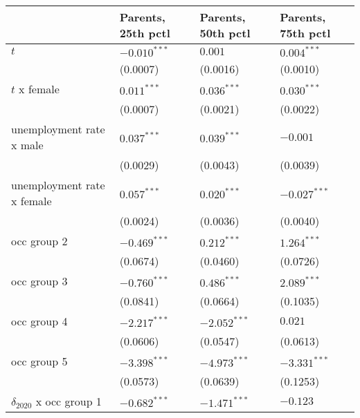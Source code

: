 \begin{tabular}{llll}
\toprule
{} & Parents, 25th pctl & Parents, 50th pctl & Parents, 75th pctl \\
\midrule
$t$                                    &     $-0.010^{***}$ &            $0.001$ &      $0.004^{***}$ \\
                                       &           (0.0007) &           (0.0016) &           (0.0010) \\
$t$ x female                           &      $0.011^{***}$ &      $0.036^{***}$ &      $0.030^{***}$ \\
                                       &           (0.0007) &           (0.0021) &           (0.0022) \\
unemployment rate x male               &      $0.037^{***}$ &      $0.039^{***}$ &           $-0.001$ \\
                                       &           (0.0029) &           (0.0043) &           (0.0039) \\
unemployment rate x female             &      $0.057^{***}$ &      $0.020^{***}$ &     $-0.027^{***}$ \\
                                       &           (0.0024) &           (0.0036) &           (0.0040) \\
occ group 2                            &     $-0.469^{***}$ &      $0.212^{***}$ &      $1.264^{***}$ \\
                                       &           (0.0674) &           (0.0460) &           (0.0726) \\
occ group 3                            &     $-0.760^{***}$ &      $0.486^{***}$ &      $2.089^{***}$ \\
                                       &           (0.0841) &           (0.0664) &           (0.1035) \\
occ group 4                            &     $-2.217^{***}$ &     $-2.052^{***}$ &            $0.021$ \\
                                       &           (0.0606) &           (0.0547) &           (0.0613) \\
occ group 5                            &     $-3.398^{***}$ &     $-4.973^{***}$ &     $-3.331^{***}$ \\
                                       &           (0.0573) &           (0.0639) &           (0.1253) \\
$\delta_{2020}$ x occ group 1          &     $-0.682^{***}$ &     $-1.471^{***}$ &           $-0.123$ \\

\end{tabular}

